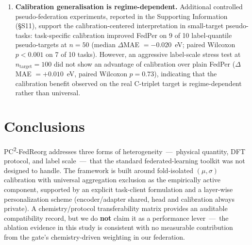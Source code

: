 \documentclass[11pt,a4paper]{article}
\newcommand{\PC}{PC\textsuperscript{2}-FedReorg}
\begin{document}
\begin{enumerate}
  \item \textbf{Calibration generalisation is regime-dependent.} Additional controlled pseudo-federation experiments, reported in the Supporting Information (\S S11), support the calibration-centered interpretation in small-target pseudo-tasks: task-specific calibration improved FedPer on 9 of 10 label-quantile pseudo-targets at $n = 50$ (median $\Delta$MAE $= -0.020$~eV; paired Wilcoxon $p < 0.001$ on 7 of 10 tasks). However, an aggressive label-scale stress test at $n_{\mathrm{target}} = 100$ did not show an advantage of calibration over plain FedPer ($\Delta$MAE $= +0.010$~eV, paired Wilcoxon $p = 0.73$), indicating that the calibration benefit observed on the real C-triplet target is regime-dependent rather than universal.
\end{enumerate}

\section{Conclusions}\label{sec:conclusion}

\PC{} addresses three forms of heterogeneity~---~physical quantity, DFT protocol, and label scale~---~that the standard federated-learning toolkit was not designed to handle. The framework is built around fold-isolated $(\mu, \sigma)$ calibration with universal aggregation exclusion as the empirically active component, supported by an explicit task-client formulation and a layer-wise personalization scheme (encoder/adapter shared, head and calibration always private). A chemistry/protocol transferability matrix provides an auditable compatibility record, but we do \textbf{not} claim it as a performance lever~---~the ablation evidence in this study is consistent with no measurable contribution from the gate's chemistry-driven weighting in our federation.
\end{document}
